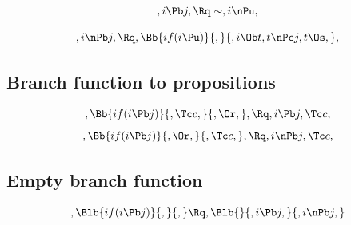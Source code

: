 \[,i \Pb j, \Rq \sim, i \nPu, \]


\[,i \nPb j, \Rq ,  \Bb{if(i \Pu)}{,}{,i \Ob t, t \nPc j, t \Os,},\]



\subsection{Branch function to propositions}
\[,\Bb{if(i \Pb j)}{,\Tc c,}{,\Or,}, \Rq ,i \Pb j, \Tc c,\]
\bigskip
\bigskip
\[,\Bb{if(i \Pb j)}{,\Or,}{,\Tc c,}, \Rq ,i \nPb j, \Tc c,\]
\bigskip
\bigskip


\subsection{Empty branch function} 
\[, \Blb{if(i \Pb j)}{,}{,} \Rq , \Blb{}{, i \Pb j,}{, i \nPb j,}\]



\bigskip
\bigskip
